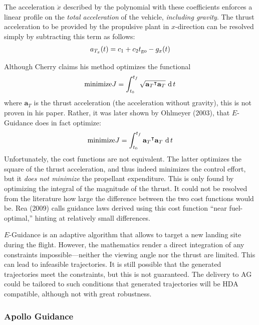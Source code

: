 \documentclass[%
]{aiaa-tc}
\begin{document}
The acceleration $\ddot{x}$ described by the polynomial with these coefficients
enforces a linear profile on the \emph{total acceleration} of the vehicle,
\emph{including gravity}. The thrust acceleration to be provided
by the propulsive plant in $x$-direction can be resolved simply by subtracting
this term as follows:
\begin{align}
	a_{T_x}(t) = c_1 + c_2 t_{\text{go}} - g_x(t) \label{eqn:egaccel}
\end{align}

Although Cherry claims his method optimizes the functional
\begin{align}
    \text{minimize} J = \int_{t_0}^{t_f} \sqrt{{\mathbf{a}_T}^{\intercal} \mathbf{a}_T}\, \operatorname{d} t
\end{align}
where $\mathbf{a}_T$ is the thrust acceleration (the acceleration without
gravity), this is not proven in his paper. Rather, it was later shown by
Ohlmeyer (2003), that $E$-Guidance does in fact optimize:\cite{Ohlmeyer2003}
\begin{align}
    \text{minimize} J = \int_{t_0}^{t_f} {\mathbf{a}_T}^{\intercal} \mathbf{a}_T\, \operatorname{d} t
\end{align}
Unfortunately, the cost functions are not equivalent. The latter optimizes the
square of the thrust acceleration, and thus indeed minimizes the control effort,
but it \emph{does not minimize} the propellant
expenditure.\cite{Rea2009,Lion1971} This is only found by optimizing the
integral of the magnitude of the thrust. It could not be resolved from the
literature how large the difference between the two cost functions would be.
Rea (2009) calls guidance laws derived using this cost function ``near
fuel-optimal,'' hinting at relatively small differences.\cite{Rea2009}

$E$-Guidance is an adaptive algorithm that allows to target a new landing site
during the flight. However, the mathematics render a direct integration of any
constraints impossible---neither the viewing angle nor the thrust are
limited. This can lead to infeasible trajectories. It is still possible that
the generated trajectories meet the constraints, but this is not guaranteed. The
delivery to AG could be tailored to such conditions that generated trajectories
will be HDA compatible, although not with great robustness.


\subsubsection{Apollo Guidance}
\label{sec:apolloguidance}
\end{document}
